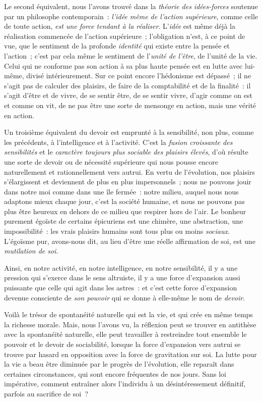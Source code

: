 \documentclass[french,twoside]{book} %
\begin{document}
Le second équivalent, nous l’avons trouvé dans la \emph{théorie des idées-forces} soutenue par un philosophe contemporain : \emph{l’idée même de l’action supérieure}, comme celle de toute action, \emph{est une force tendant à la réaliser}. L’\emph{idée} est même déjà la réalisation commencée de l’action supérieure ; l’obligation n’est, à ce point de vue, que le sentiment de la profonde \emph{identité} qui existe entre la pensée et l’action ; c’est par cela même le sentiment de l’\emph{unité de l’être}, de l’unité de la vie. Celui qui ne conforme pas son action à sa plus haute pensée est en lutte avec lui-même, divisé intérieurement. Sur ce point encore l’hédonisme est dépassé ; il ne s’agit pas de calculer des plaisirs, de faire de la comptabilité et de la finalité : il s’agit d’être et de vivre, de se sentir être, de se sentir vivre, d’agir comme on est et comme on vit, de ne pas être une sorte de mensonge en action, mais une vérité en action.\par
Un troisième équivalent du devoir est emprunté à la sensibilité, non plus, comme les précédents, à l’intelligence et à l’activité. C’est la \emph{fusion croissante des sensibilités} et le \emph{caractère toujours plus sociable des plaisirs élevés}, d’où résulte une sorte de devoir ou de nécessité supérieure qui nous pousse encore naturellement et rationnellement vers autrui. En vertu de l’évolution, nos plaisirs s’élargissent et deviennent de plus en plus impersonnels ; nous ne pouvons jouir dans notre moi comme dans une île fermée : notre milieu, auquel nous nous adaptons mieux chaque jour, c’est la société humaine, et nous ne pouvons pas plus être heureux en dehors de ce milieu que respirer hors de l’air. Le bonheur purement égoïste de certains épicuriens est une chimère, une abstraction, une impossibilité : les vrais plaisirs humains sont tous plus ou moins \emph{sociaux}. L’égoïsme pur, avons-nous dit, au lieu d’être une réelle affirmation de soi, est une \emph{mutilation de soi}.\par
Ainsi, en notre activité, en notre intelligence, en notre sensibilité, il y a une pression qui s’exerce dans le sens altruiste, il y a une force d’expansion aussi puissante que celle qui agit dans les astres : et c’est cette force d’expansion devenue consciente de \emph{son pouvoir} qui se donne à elle-même le nom de \emph{devoir}.\par
Voilà le trésor de spontanéité naturelle qui est la vie, et qui crée en même temps la richesse morale. Mais, nous l’avons vu, la réflexion peut se trouver en antithèse avec la spontanéité naturelle, elle peut travailler à restreindre tout ensemble le pouvoir et le devoir de sociabilité, lorsque la force d’expansion vers autrui se trouve par hasard en opposition avec la force de gravitation sur soi. La lutte pour la vie a beau être diminuée par le progrès de l’évolution, elle reparaît dans certaines circonstances, qui sont encore fréquentes de nos jours. Sans loi impérative, comment entraîner alors l’individu à un désintéressement définitif, parfois au sacrifice de soi ?\par
\end{document}

